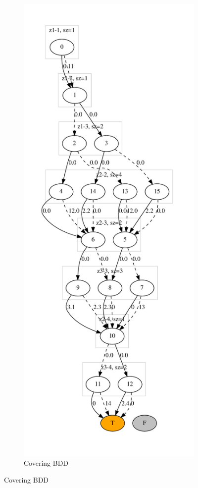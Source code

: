 \documentclass[11pt]{article}
\begin{document}
\begin{figure}[t!]
  \begin{subfigure}[t]{0.45\textwidth}
    \includegraphics[height=\textheight]{./C_aligned.dot.pdf}
    \caption{Covering BDD}\label{fig:coverA}

\end{subfigure}
\end{figure}
\end{document}
